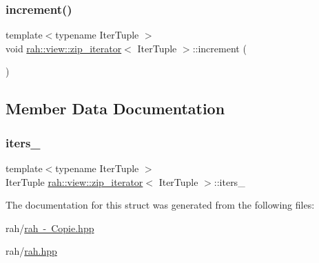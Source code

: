 \subsubsection{\texorpdfstring{increment()}{increment()}\hspace{0.1cm}{\footnotesize\ttfamily [2/2]}}
{\footnotesize\ttfamily template$<$typename Iter\+Tuple $>$ \\
void \mbox{\hyperlink{structrah_1_1view_1_1zip__iterator}{rah\+::view\+::zip\+\_\+iterator}}$<$ Iter\+Tuple $>$\+::increment (\begin{DoxyParamCaption}{ }\end{DoxyParamCaption})\hspace{0.3cm}{\ttfamily [inline]}}



\subsection{Member Data Documentation}
\mbox{\label{structrah_1_1view_1_1zip__iterator_a58f5f6dd935fe51dd3c3a28e3b06ecc9}} 
\subsubsection{\texorpdfstring{iters\_}{iters\_}}
{\footnotesize\ttfamily template$<$typename Iter\+Tuple $>$ \\
Iter\+Tuple \mbox{\hyperlink{structrah_1_1view_1_1zip__iterator}{rah\+::view\+::zip\+\_\+iterator}}$<$ Iter\+Tuple $>$\+::iters\+\_\+}



The documentation for this struct was generated from the following files\+:\begin{DoxyCompactItemize}
\item 
rah/\mbox{\hyperlink{rah_01-_01_copie_8hpp}{rah -\/ Copie.\+hpp}}\item 
rah/\mbox{\hyperlink{rah_8hpp}{rah.\+hpp}}\end{DoxyCompactItemize}
